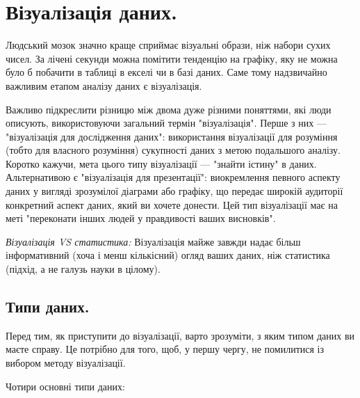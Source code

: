 \chapter{Візуалізація даних.}

Людський мозок значно краще сприймає візуальні образи, ніж набори сухих чисел. За лічені секунди можна помітити тенденцію на графіку, яку не можна було б побачити в таблиці в екселі чи в базі даних. Саме тому надзвичайно важливим етапом аналізу даних є візуалізація.

Важливо підкреслити різницю між двома дуже різними поняттями, які люди описують, використовуючи загальний термін "візуалізація". Перше з них — "візуалізація для дослідження даних": використання візуалізації для розуміння (тобто для власного розуміння) сукупності даних з метою подальшого аналізу. Коротко кажучи, мета цього типу візуалізації — "знайти істину" в даних. Альтернативою є "візуалізація для презентації": виокремлення певного аспекту даних у вигляді зрозумілої діаграми або графіку, що передає широкій аудиторії конкретний аспект даних, який ви хочете донести. Цей тип візуалізації має на меті "переконати інших людей у правдивості ваших висновків".

\textit{Візуалізація VS статистика:} Візуалізація майже завжди надає більш інформативний (хоча і менш кількісний) огляд ваших даних, ніж статистика (підхід, а не галузь науки в цілому).


\section{Типи даних.}

Перед тим, як приступити до візуалізації, варто зрозуміти, з яким типом даних ви маєте справу. Це потрібно для того, щоб, у першу чергу, не помилитися із вибором методу візуалізації.

Чотири основні типи даних:

